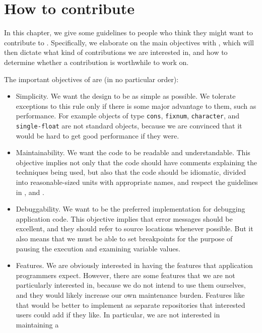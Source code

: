 \chapter{How to contribute}

In this chapter, we give some guidelines to people who think they
might want to contribute to \sysname{}.  Specifically, we elaborate on
the main objectives with \sysname{}, which will then dictate what kind
of contributions we are interested in, and how to determine whether a
contribution is worthwhile to work on.

The important objectives of \sysname{} are (in no particular order):

\begin{itemize}
\item Simplicity.  We want the design to be as simple as possible.  We
  tolerate exceptions to this rule only if there is some major
  advantage to them, such as performance.  For example objects of
  type \texttt{cons}, \texttt{fixnum}, \texttt{character}, and
  \texttt{single-float} are not standard objects, because we are
  convinced that it would be hard to get good performance if they
  were.
\item Maintainability.  We want the code to be readable and
  understandable.  This objective implies not only that the code
  should have comments explaining the techniques being used, but also
  that the code should be idiomatic, divided into reasonable-sized
  units with appropriate names, and respect the guidelines in
  , and
  .
\item Debuggability.  We want \sysname{} to be the preferred
  \commonlisp{} implementation for debugging application code.  This
  objective implies that error messages should be excellent, and they
  should refer to source locations whenever possible.  But it also
  means that we must be able to set breakpoints for the purpose of
  pausing the execution and examining variable values.
\item Features.  We are obviously interested in \sysname{} having the
  features that application programmers expect.  However, there are
  some features that we are not particularly interested in, because we
  do not intend to use them ourselves, and they would likely increase
  our own maintenance burden.  Features like that would be better to
  implement as separate repositories that interested users could add
  if they like.  In particular, we are not interested in maintaining a

\end{itemize}
